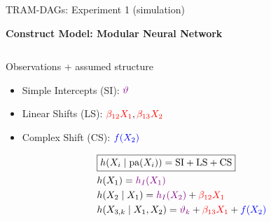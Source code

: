 \documentclass[onlytextwidth,english]{beamer}\usepackage[]{graphicx}\usepackage[]{xcolor}
\begin{document}
\begin{frame}{TRAM-DAGs: Experiment 1 (simulation)}

\textbf{Construct Model: Modular Neural Network}

\begin{columns}

\begin{column}{0.65\textwidth}

\vspace{0.1cm}

 Observations + assumed structure

\vspace{0.2cm}

\begin{itemize}
    \item Simple Intercepts (SI): $\textcolor{violet}{\vartheta}$
    \item Linear Shifts (LS): $\textcolor{red}{\beta_{12}X_1}, \textcolor{red}{\beta_{13}X_2}$
    \item Complex Shift (CS):  $\textcolor{blue}{f(X_2)}$
\end{itemize}

\vspace{0.2cm}
\begin{align*}
& \boxed{h(X_i \mid \text{pa}(X_i)) = \text{SI} + \text{LS} + \text{CS}} \\
& h(X_1) = \textcolor{violet}{h_I(X_1)} \\
& h(X_2 \mid X_1) = \textcolor{violet}{h_I(X_2)} + \textcolor{red}{\beta_{12} X_1} \\
& h(X_{3,k} \mid X_1, X_2) = \textcolor{violet}{\vartheta_k} + \textcolor{red}{\beta_{13} X_1} + \textcolor{blue}{f(X_2)} 
\end{align*}

\end{column}


\end{columns}
\end{frame}
\end{document}

